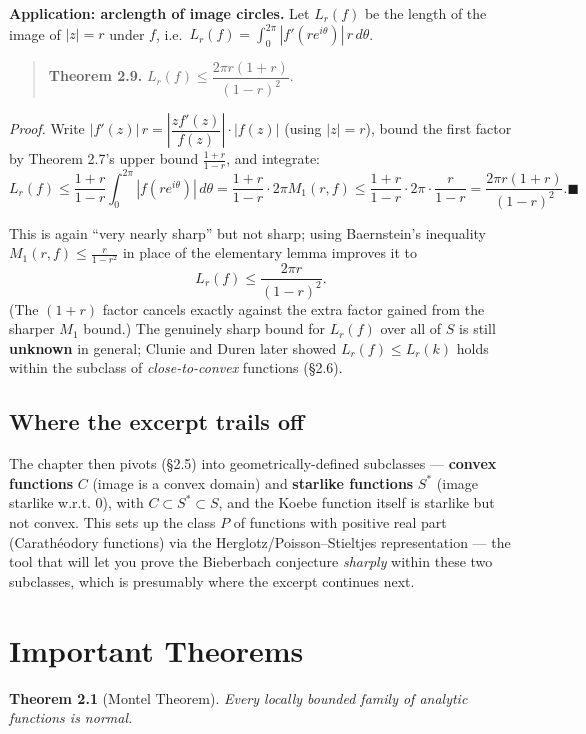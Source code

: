 \documentclass[
]{book}
\newtheorem{theorem}{Theorem}[chapter]
\theoremstyle{definition}
\theoremstyle{definition}
\theoremstyle{definition}
\theoremstyle{definition}
\theoremstyle{remark}
\begin{document}
\textbf{Application: arclength of image circles.} Let \(L_r(f)\) be the length of the image of \(|z|=r\) under \(f\), i.e.~\(L_r(f)=\int_0^{2\pi}|f'(re^{i\theta})|\,r\,d\theta\).

\begin{quote}
\textbf{Theorem 2.9.} \(L_r(f) \le \dfrac{2\pi r(1+r)}{(1-r)^2}\).
\end{quote}

\emph{Proof.} Write \(|f'(z)|\,r = \left|\dfrac{zf'(z)}{f(z)}\right|\cdot|f(z)|\) (using \(|z|=r\)), bound the first factor by Theorem 2.7's upper bound \(\tfrac{1+r}{1-r}\), and integrate:
\[L_r(f) \le \frac{1+r}{1-r}\int_0^{2\pi}|f(re^{i\theta})|\,d\theta = \frac{1+r}{1-r}\cdot 2\pi M_1(r,f) \le \frac{1+r}{1-r}\cdot 2\pi\cdot\frac{r}{1-r} = \frac{2\pi r(1+r)}{(1-r)^2}. \blacksquare\]

This is again ``very nearly sharp'' but not sharp; using Baernstein's inequality \(M_1(r,f)\le \frac{r}{1-r^2}\) in place of the elementary lemma improves it to
\[L_r(f) \le \frac{2\pi r}{(1-r)^2}.\]
(The \((1+r)\) factor cancels exactly against the extra factor gained from the sharper \(M_1\) bound.) The genuinely sharp bound for \(L_r(f)\) over all of \(S\) is still \textbf{unknown} in general; Clunie and Duren later showed \(L_r(f)\le L_r(k)\) holds within the subclass of \emph{close-to-convex} functions (§2.6).

\section{Where the excerpt trails off}\label{where-the-excerpt-trails-off}

The chapter then pivots (§2.5) into geometrically-defined subclasses --- \textbf{convex functions} \(C\) (image is a convex domain) and \textbf{starlike functions} \(S^*\) (image starlike w.r.t. \(0\)), with \(C \subset S^* \subset S\), and the Koebe function itself is starlike but not convex. This sets up the class \(P\) of functions with positive real part (Carathéodory functions) via the Herglotz/Poisson--Stieltjes representation --- the tool that will let you prove the Bieberbach conjecture \emph{sharply} within these two subclasses, which is presumably where the excerpt continues next.

\chapter{Important Theorems}\label{important-theorems}

\begin{theorem}[Montel Theorem]
\protect\hypertarget{thm:montel}{}\label{thm:montel}Every locally bounded family of analytic functions is normal.
\end{theorem}
\end{document}
